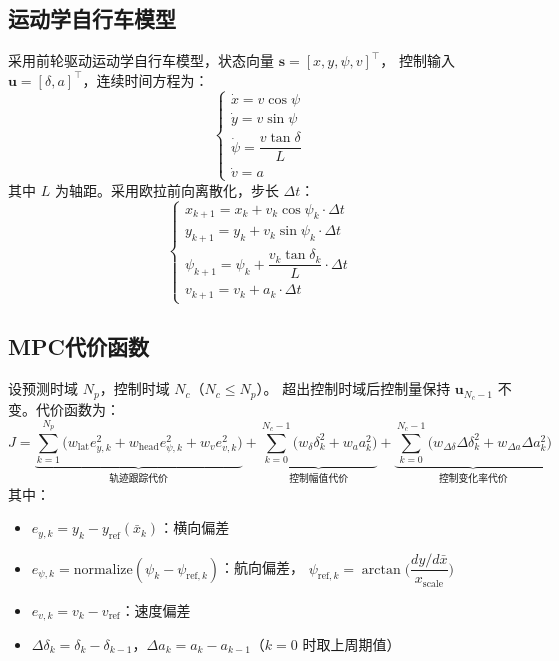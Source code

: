 \documentclass[a4paper,10pt]{article}
\begin{document}
\subsection{运动学自行车模型}

采用前轮驱动运动学自行车模型，状态向量 $\mathbf{s} = [x, y, \psi, v]^{\!\top}$，
控制输入 $\mathbf{u} = [\delta, a]^{\!\top}$，连续时间方程为：
\begin{equation}
  \begin{cases}
    \dot{x} = v \cos\psi \\
    \dot{y} = v \sin\psi \\
    \dot{\psi} = \dfrac{v \tan\delta}{L} \\
    \dot{v} = a
  \end{cases}
\end{equation}
其中 $L$ 为轴距。采用欧拉前向离散化，步长 $\Delta t$：
\begin{equation}
  \begin{cases}
    x_{k+1} = x_k + v_k \cos\psi_k \cdot \Delta t \\
    y_{k+1} = y_k + v_k \sin\psi_k \cdot \Delta t \\
    \psi_{k+1} = \psi_k + \dfrac{v_k \tan\delta_k}{L} \cdot \Delta t \\
    v_{k+1} = v_k + a_k \cdot \Delta t
  \end{cases}
\end{equation}

\subsection{MPC代价函数}

设预测时域 $N_p$，控制时域 $N_c$（$N_c \leq N_p$）。
超出控制时域后控制量保持 $\mathbf{u}_{N_c-1}$ 不变。代价函数为：
\begin{equation}
  J = \underbrace{\sum_{k=1}^{N_p} \Big( w_{\text{lat}} e_{y,k}^2 + w_{\text{head}} e_{\psi,k}^2 + w_{v} e_{v,k}^2 \Big)}_{\text{轨迹跟踪代价}}
    + \underbrace{\sum_{k=0}^{N_c-1} \Big( w_\delta \delta_k^2 + w_a a_k^2 \Big)}_{\text{控制幅值代价}}
    + \underbrace{\sum_{k=0}^{N_c-1} \Big( w_{\Delta\delta} \Delta\delta_k^2 + w_{\Delta a} \Delta a_k^2 \Big)}_{\text{控制变化率代价}}
\end{equation}
其中：
\begin{itemize}
  \item $e_{y,k} = y_k - y_{\text{ref}}(\bar{x}_k)$：横向偏差
  \item $e_{\psi,k} = \text{normalize}(\psi_k - \psi_{\text{ref},k})$：航向偏差，
        $\psi_{\text{ref},k} = \arctan\!\Big(\dfrac{dy/d\bar{x}}{x_{\text{scale}}}\Big)$
  \item $e_{v,k} = v_k - v_{\text{ref}}$：速度偏差
  \item $\Delta\delta_k = \delta_k - \delta_{k-1}$，$\Delta a_k = a_k - a_{k-1}$（$k{=}0$ 时取上周期值）
\end{itemize}
\end{document}
